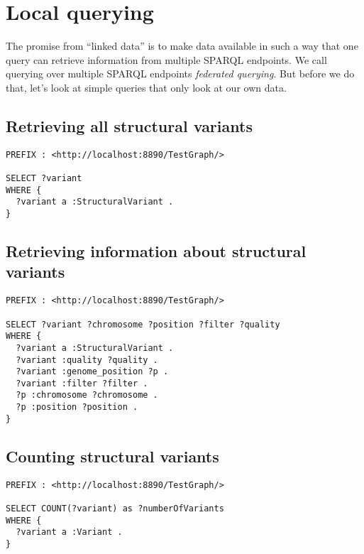 \documentclass[11pt,a4paper,oneside]{book}
\begin{document}
\section{Local querying}

  The promise from ``linked data'' is to make data available in such a way that
  one query can retrieve information from multiple SPARQL endpoints.  We call
  querying over multiple SPARQL endpoints \emph{federated querying}.  But before
  we do that, let's look at simple queries that only look at our own data.

\subsection{Retrieving all structural variants}
\begin{siderules}
\begin{verbatim}
PREFIX : <http://localhost:8890/TestGraph/>

SELECT ?variant
WHERE {
  ?variant a :StructuralVariant .
}
\end{verbatim} 
\end{siderules}

\subsection{Retrieving information about structural variants}
\label{sec:sparqling-svs}

\begin{siderules}
\begin{verbatim}
PREFIX : <http://localhost:8890/TestGraph/>

SELECT ?variant ?chromosome ?position ?filter ?quality
WHERE {
  ?variant a :StructuralVariant .
  ?variant :quality ?quality .
  ?variant :genome_position ?p .
  ?variant :filter ?filter .
  ?p :chromosome ?chromosome .
  ?p :position ?position .
}
\end{verbatim}
\end{siderules}

\subsection{Counting structural variants}

\begin{siderules}
\begin{verbatim}
PREFIX : <http://localhost:8890/TestGraph/>

SELECT COUNT(?variant) as ?numberOfVariants
WHERE {
  ?variant a :Variant .
}
\end{verbatim}
\end{siderules}
\end{document}
